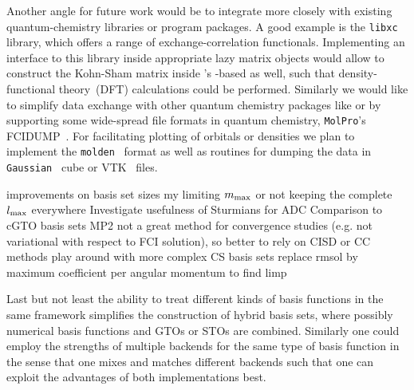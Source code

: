 Another angle for future work would be to integrate more closely
with existing quantum-chemistry libraries or program packages.
A good example is the \texttt{libxc}~\cite{Lehtola2018} library,
which offers a range of exchange-correlation functionals.
Implementing an interface to this library inside appropriate
lazy matrix objects would allow to construct the Kohn-Sham matrix
inside \molsturm's \contraction-based \SCF as well,
such that density-functional theory~(DFT) calculations
could be performed.
Similarly we would like to simplify
data exchange with other quantum chemistry packages like \pyscf or \psifour
by supporting some wide-spread file formats in quantum chemistry,
\eg \texttt{MolPro}'s FCIDUMP~\cite{Knowles1989}.
For facilitating plotting of \SCF orbitals or densities
we plan to implement the \texttt{molden}~\cite{Schaftenaar2000} format
as well as routines for dumping the data
in \texttt{Gaussian}~\cite{Frisch2016} cube or VTK~\cite{Avila2010} files.

%
%
improvements on basis set sizes my limiting $m_\text{max}$ or not keeping the complete $l_\text{max}$ everywhere
Investigate usefulness of Sturmians for ADC
Comparison to cGTO basis sets
MP2 not a great method for convergence studies (e.g. not variational with respect to FCI solution), so better to rely on CISD or CC methods
play around with more complex CS basis sets
replace rmsol by maximum coefficient per angular momentum to find limp

%
%
Last but not least the ability to treat different kinds of basis functions
in the same framework simplifies the construction of hybrid basis sets,
where possibly numerical basis functions and GTOs or STOs are combined.
Similarly one could employ the strengths of multiple backends for the same type of basis function
in the sense that one mixes and matches different backends such that one can exploit
the advantages of both implementations best.
